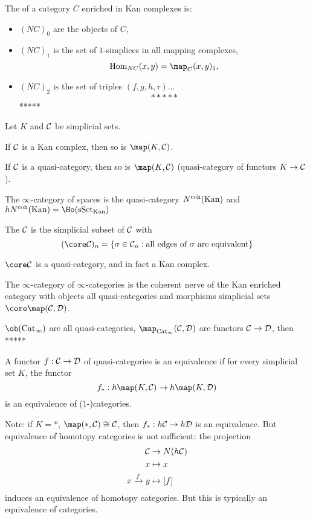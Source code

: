 {The  of a category $C$ enriched in Kan complexes is:
\begin{itemize}
    \item $(NC)_0$ are the objects of $C$,
    \item $(NC)_1$ is the set of $1$-simplices in all mapping complexes,
    \[\Hom_{NC}(x,y)=\map_C(x,y)_1,\]
    \item $(NC)_2$ is the set of triples $(f,g,h,\tau)$...
    \[*****\]
    *****
\end{itemize}

\begin{proposition}
Let $K$ and $\mathcal{C}$ be simplicial sets.
\begin{numerate}
\item If $\mathcal{C}$ is a Kan complex, then so is $\map(K,\Cc)$.
\item If $\mathcal{C}$ is a quasi-category, then so is $\map(K,\Cc)$ (quasi-category of functors $K\to\mathcal{C}$).
\end{numerate}
\end{proposition}

The $\infty$-category of spaces is the quasi-category $N^\text{coh}({\mathrm{Kan}})$ and $hN^\text{coh}(\Kan)=\Ho(\sSet_\text{Kan})$

The  $\mathcal{C}$ is the simplicial subset of $\mathcal{C}$ with
\[(\core\Cc)_n=\cb{\sigma\in\Cc_n:\text{all edges of }\sigma\text{ are equivalent}}\]

\begin{theorem}
$\core\Cc$ is a quasi-category, and in fact a Kan complex.
\end{theorem}

The $\infty$-category of $\infty$-categories is the coherent nerve of the Kan enriched category with objects all quasi-categories and morphisms simplicial sets $\core\map(\Cc,\Dd)$.

$\ob(\Cat_\infty)$ are all quasi-categories, $\map_{\Cat_\infty}(\Cc,\Dd)$ are functors $\mathcal{C}\to\mathcal{D}$, then *****

A functor $f:\mathcal{C}\to\mathcal{D}$ of quasi-categories is an equivalence if for every simplicial set $K$, the functor
\[f_*:h\map(K,\Cc)\to h\map(K,\Dd)\]
is an equivalence of ($1$-)categories.

Note: if $K=*$, $\map(*,\Cc)\cong\Cc$, then $f_*:h\mathcal{C}\to h\mathcal{D}$ is an equivalence. But equivalence of homotopy categories is not sufficient: the projection
\begin{align*}
    \mathcal{C}&\to N(h\mathcal{C})\\
    x&\mapsto x\\
    x\xrightarrow{f}y&\mapsto[f]
\end{align*}
induces an equivalence of homotopy categories. But this is typically  an equivalence of categories.

}
